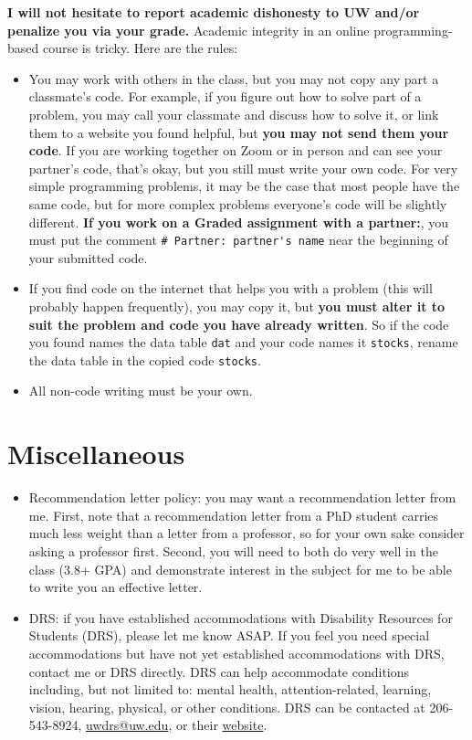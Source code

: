 \documentclass[12pt]{article}
\begin{document}
\textbf{I will not hesitate to report academic dishonesty to UW and/or penalize you via your grade.} Academic integrity in an online programming-based course is tricky. Here are the rules:
\begin{itemize}
	\item You may work with others in the class, but you may not copy any part a classmate's code. For example, if you figure out how to solve part of a problem, you may call your classmate and discuss how to solve it, or link them to a website you found helpful, but \textbf{you may not send them your code}. If you are working together on Zoom or in person and can see your partner's code, that's okay, but you still must write your own code. For very simple programming problems, it may be the case that most people have the same code, but for more complex problems everyone's code will be slightly different. \textbf{If you work on a Graded assignment with a partner:}, you must put the comment \verb|# Partner: partner's name| near the beginning of your submitted code.
	\item If you find code on the internet that helps you with a problem (this will probably happen frequently), you may copy it, but \textbf{you must alter it to suit the problem and code you have already written}. So if the code you found names the data table \verb|dat| and your code names it \verb|stocks|, rename the data table in the copied code \verb|stocks|.
	\item All non-code writing must be your own.
\end{itemize}

\section*{Miscellaneous}

\begin{itemize}
	\item Recommendation letter policy: you may want a recommendation letter from me. First, note that a recommendation letter from a PhD student carries much less weight than a letter from a professor, so for your own sake consider asking a professor first. Second, you will need to both do very well in the class (3.8+ GPA) and demonstrate interest in the subject for me to be able to write you an effective letter.
	\item DRS: if you have established accommodations with Disability Resources for Students (DRS), please let me know ASAP. If you feel you need special accommodations but have not yet established accommodations with DRS, contact me or DRS directly. DRS can help accommodate conditions including, but not limited to: mental health, attention-related, learning, vision, hearing, physical, or other conditions. DRS can be contacted at 206-543-8924, \href{mailto:uwdrs@uw.edu}{uwdrs@uw.edu}, or their \href{http://depts.washington.edu/uwdrs/}{website}.
\end{itemize}
\end{document}
